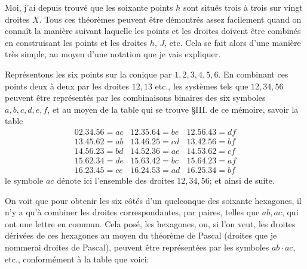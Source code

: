 \documentclass[11pt,a4paper]{book}
\begin{document}
Moi, j'ai depuis trouv\'{e} que les soixante points $h$ sont situ\'{e}s trois \`{a} trois sur vingt droites $X$. Tous ces th\'{e}or\`{e}mes peuvent \^{e}tre d\'{e}montr\'{e}s assez facilement quand on conna\^{i}t la mani\`{e}re suivant laquelle les points et les droites doivent \^{e}tre combin\'{e}s en construisant les points et les droites $h$, $J$, etc. Cela se fait alors d'une mani\`{e}re tr\`{e}s simple, au moyen d'une notation que je vais expliquer.

Repr\'{e}sentons les six points sur la conique par $1, 2, 3, 4, 5, 6$. En combinant ces points deux \`{a} deux par les droites $12, 13$ etc., les syst\`{e}mes tels que $12, 34, 56$ peuvent \^{e}tre repr\'{e}sent\'{e}s par les combinaisons binaires des six symboles $a, b, c, d, e, f$, et au moyen de la table qui se trouve \S III. de ce m\'{e}moire, savoir la table
\begin{equation}\tag{A}
\begin{array}{lll}
02.34.56 = ac & 12.35.64 = be & 12.56.43 = df \\
13.45.62 = ab & 13.46.25 = cd & 13.42.56 = bf \\
14.56.23 = bd & 14.52.36 = ae & 14.53.62 = cf \\
15.62.34 = de & 15.63.42 = bc & 15.64.23 = af \\
16.23.45 = ce & 16.24.53 = ad & 16.25.34 = bf
\end{array}
\end{equation}
le symbole $ac$ d\'{e}note ici l'ensemble des droites $12, 34, 56$; et ainsi de suite.

On voit que pour obtenir les six c\^{o}t\'{e}s d'un quelconque des soixante hexagones, il n'y a qu'\`{a} combiner les droites correspondantes, par paires, telles que $ab, ac$, qui ont une lettre en commun. Cela pos\'{e}, les hexagones, ou, si l'on veut, les droites d\'{e}riv\'{e}es de ces hexagones au moyen du th\'{e}or\`{e}me de Pascal (droites que je nommerai droites de Pascal), peuvent \^{e}tre repr\'{e}sent\'{e}es par les symboles $ab \cdot ac$, etc., conform\'{e}ment \`{a} la table que voici:
\end{document}
